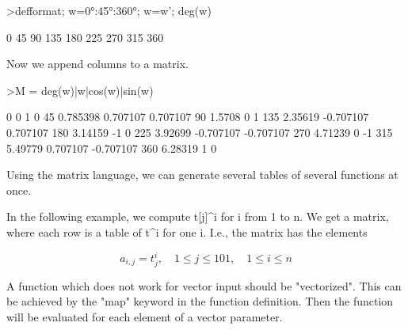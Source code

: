 \documentclass{article}
\begin{document}
\begin{eulernotebook}
\begin{eulercomment}
\begin{eulercomment}
\begin{eulercomment}
\begin{eulercomment}
\begin{eulercomment}
\begin{eulercomment}
\begin{eulerprompt}
>defformat; w=0°:45°:360°; w=w'; deg(w)
\end{eulerprompt}
\begin{euleroutput}
              0 
             45 
             90 
            135 
            180 
            225 
            270 
            315 
            360 
\end{euleroutput}
\begin{eulercomment}
Now we append columns to a matrix.
\end{eulercomment}
\begin{eulerprompt}
>M = deg(w)|w|cos(w)|sin(w)
\end{eulerprompt}
\begin{euleroutput}
              0             0             1             0 
             45      0.785398      0.707107      0.707107 
             90        1.5708             0             1 
            135       2.35619     -0.707107      0.707107 
            180       3.14159            -1             0 
            225       3.92699     -0.707107     -0.707107 
            270       4.71239             0            -1 
            315       5.49779      0.707107     -0.707107 
            360       6.28319             1             0 
\end{euleroutput}
\begin{eulercomment}
Using the matrix language, we can generate several tables of several
functions at once.

In the following example, we compute t[j]\textasciicircum{}i for i from 1 to n. We get a matrix,
where each row is a table of t\textasciicircum{}i for one i. I.e., the matrix has the
elements
\end{eulercomment}
\begin{eulerformula}
\[
a_{i,j} = t_j^i, \quad 1 \le j \le 101, \quad 1 \le i \le n
\]
\end{eulerformula}
\begin{eulercomment}
A function which does not work for vector input should be "vectorized". This
can be achieved by the "map" keyword in the function definition. Then the
function will be evaluated for each element of a vector parameter.


\end{eulercomment}
\end{eulercomment}
\end{eulercomment}
\end{eulercomment}
\end{eulercomment}
\end{eulercomment}
\end{eulercomment}
\end{eulernotebook}
\end{document}
